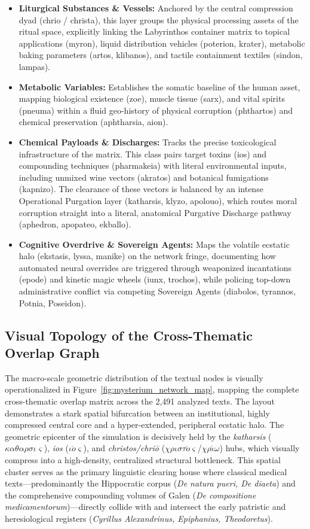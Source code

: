 \documentclass[11pt,twoside,a4paper]{article}
\begin{document}
\begin{itemize}
\item \textbf{Liturgical Substances \& Vessels:} Anchored by the central compression dyad (chrio / christa), this layer groups the physical processing assets of the ritual space, explicitly linking the Labyrinthos container matrix to topical applications (myron), liquid distribution vehicles (poterion, krater), metabolic baking parameters (artos, klibanos), and tactile containment textiles (sindon, lampas).
\item \textbf{Metabolic Variables:} Establishes the somatic baseline of the human asset, mapping biological existence (zoe), muscle tissue (sarx), and vital spirits (pneuma) within a fluid geo-history of physical corruption (phthartos) and chemical preservation (aphtharsia, aion).
\item \textbf{Chemical Payloads \& Discharges:} Tracks the precise toxicological infrastructure of the matrix. This class pairs target toxins (ios) and compounding techniques (pharmakeia) with literal environmental inputs, including unmixed wine vectors (akratos) and botanical fumigations (kapnizo). The clearance of these vectors is balanced by an intense Operational Purgation layer (katharsis, klyzo, apolouo), which routes moral corruption straight into a literal, anatomical Purgative Discharge pathway (aphedron, apopateo, ekballo).
\item \textbf{Cognitive Overdrive \& Sovereign Agents:} Maps the volatile ecstatic halo (ekstasis, lyssa, manike) on the network fringe, documenting how automated neural overrides are triggered through weaponized incantations (epode) and kinetic magic wheels (iunx, trochos), while policing top-down administrative conflict via competing Sovereign Agents (diabolos, tyrannos, Potnia, Poseidon).
\end{itemize}


\subsection{Visual Topology of the Cross-Thematic Overlap Graph}
The macro-scale geometric distribution of the textual nodes is visually operationalized in Figure~\ref{fig:mysterium_network_map}, mapping the complete cross-thematic overlap matrix across the 2,491 analyzed texts. The layout demonstrates a stark spatial bifurcation between an institutional, highly compressed central core and a hyper-extended, peripheral ecstatic halo. The geometric epicenter of the simulation is decisively held by the \textit{katharsis} ($\kappa\alpha\theta\alpha\rho\sigma\iota\varsigma$), \textit{ios} ($\iota\acute{o}\varsigma$), and \textit{christos/chri\={o}} ($\chi\rho\iota\sigma\tau\acute{o}\varsigma$/$\chi\rho\acute{\iota}\omega$) hubs, which visually compress into a high-density, centralized structural bottleneck. This spatial cluster serves as the primary linguistic clearing house where classical medical texts—predominantly the Hippocratic corpus (\textit{De natura pueri, De diaeta}) and the comprehensive compounding volumes of Galen (\textit{De compositione medicamentorum})—directly collide with and intersect the early patristic and heresiological registers (\textit{Cyrillus Alexandrinus, Epiphanius, Theodoretus}).
\end{document}
